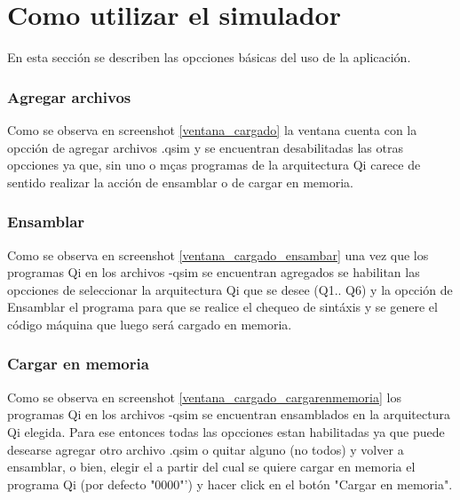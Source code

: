 \section{Como utilizar el simulador}

En esta sección se describen las opcciones básicas del uso de la aplicación.

\subsubsection{Agregar archivos}
Como se observa en screenshot \ref{ventana_cargado} la ventana cuenta con la opcción de agregar archivos .qsim y se encuentran desabilitadas las otras opcciones ya que, sin uno o mças programas de la arquitectura Qi carece de sentido realizar la acción de ensamblar o de cargar en memoria.

\subsubsection{Ensamblar}
Como se observa en screenshot \ref{ventana_cargado_ensambar} una vez que los programas Qi en los archivos -qsim se encuentran agregados se habilitan las opcciones de seleccionar la arquitectura Qi que se desee (Q1.. Q6) y la opcción de Ensamblar el programa para que se realice el chequeo de sintáxis y se genere el código máquina que luego será cargado en memoria.


\subsubsection{Cargar en memoria}
Como se observa en screenshot \ref{ventana_cargado_cargarenmemoria} los programas Qi en los archivos -qsim se encuentran ensamblados en la arquitectura Qi elegida.
Para ese entonces todas las opcciones estan habilitadas ya que puede desearse agregar otro archivo .qsim o quitar alguno (no todos) y volver a ensamblar, o bien, elegir el \PC a partir del cual se quiere cargar en memoria el programa Qi (por defecto "0000"') y hacer click en el botón "Cargar en memoria".

